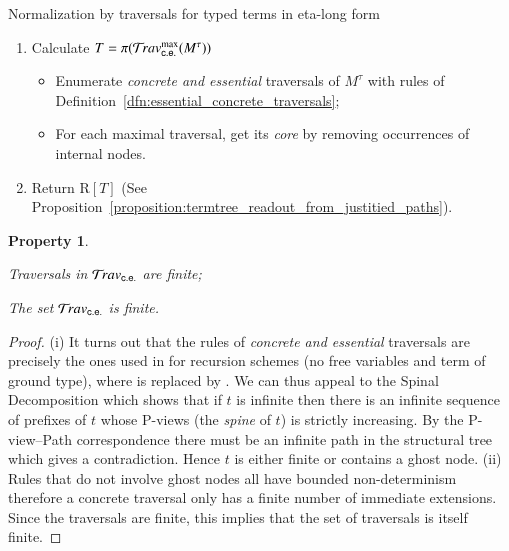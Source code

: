 \documentclass{elsarticle}
\theoremstyle{plain}
\newtheorem{property}[theorem]{Property}
\theoremstyle{definition}
\newcommand{\concreteessential}{{\sf c.e.}}
\newcommand{\travsetcones}{\travset_\concreteessential} %
\def\readout{\mathrm{R}} %
\def\coresymbol{\pi} %
\newcommand{\core}[1]{\coresymbol(#1)} %
\begin{document}
\begin{algorithm}[!ht]
\caption{Normalization by traversals for typed terms in eta-long form}
\label{algo:stlc_normalization_by_traversals}
\begin{algorithmic}
\begin{enumerate}[nosep]
  \item Calculate $T = \core{\travsetcones^{\max}(M^\tau)}$
  \begin{itemize}[nosep]
    \item Enumerate \emph{concrete and essential} traversals of $M^\tau$ with rules of Definition~\ref{dfn:essential_concrete_traversals};
    \item For each maximal traversal, get its \emph{core} by removing occurrences of internal nodes.
  \end{itemize}
  \item Return $\readout[T]$ (See Proposition~\ref{proposition:termtree_readout_from_justitied_paths}).
\end{enumerate}
\end{algorithmic}
\end{algorithm}

\begin{property}
    \label{prop:concrete_essential_trav_finite}
    \begin{enumerate*}
        \item[(i)] Traversals in $\travsetcones$ are finite;
        \item[(ii)] The set $\travsetcones$ is finite.
    \end{enumerate*}
    \end{property}
    \begin{proof}
    (i) It turns out that the rules of \emph{concrete and essential} traversals are precisely the ones used in \cite{OngLics2006} for recursion schemes (no free variables and term of ground type), where  is replaced by . We can thus appeal to the Spinal Decomposition
    \cite[Lemma 8]{OngLics2006} which shows that if $t$ is infinite then there is an infinite sequence of prefixes of $t$ whose P-views (the \emph{spine} of $t$) is strictly increasing. By the P-view--Path correspondence there must be an infinite path in the structural tree which gives a contradiction. Hence $t$ is either finite or contains a ghost node.
    (ii) Rules that do not involve ghost nodes all have bounded non-determinism therefore a concrete traversal only has a finite number of immediate extensions. Since the traversals are finite, this implies that the set of traversals is itself finite.
\end{proof}
\end{document}
